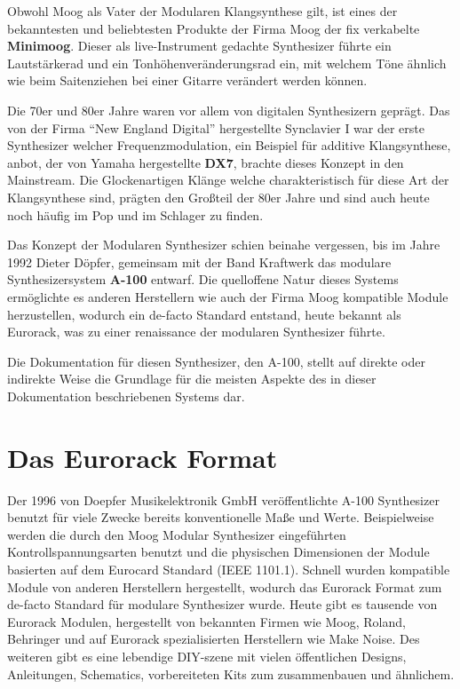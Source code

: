 Obwohl Moog als Vater der Modularen Klangsynthese gilt, ist eines der bekanntesten und beliebtesten Produkte der Firma Moog der fix verkabelte \textbf{Minimoog}. Dieser als live-Instrument gedachte Synthesizer führte ein Lautstärkerad und ein Tonhöhenveränderungsrad ein, mit welchem Töne ähnlich wie beim Saitenziehen bei einer Gitarre verändert werden können.

Die 70er und 80er Jahre waren vor allem von digitalen Synthesizern geprägt. Das von der Firma "`New England Digital"' hergestellte Synclavier I war der erste Synthesizer welcher Frequenzmodulation, ein Beispiel für additive Klangsynthese, anbot, der von Yamaha hergestellte \textbf{DX7}, brachte dieses Konzept in den Mainstream. Die Glockenartigen Klänge welche charakteristisch für diese Art der Klangsynthese sind, prägten den Großteil der 80er Jahre und sind auch heute noch häufig im Pop und im Schlager zu finden.

Das Konzept der Modularen Synthesizer schien beinahe vergessen, bis im Jahre 1992 Dieter Döpfer, gemeinsam mit der Band Kraftwerk das modulare Synthesizersystem \textbf{A-100} entwarf. Die quelloffene Natur dieses Systems ermöglichte es anderen Herstellern wie auch der Firma Moog kompatible Module herzustellen, wodurch ein de-facto Standard entstand, heute bekannt als Eurorack, was zu einer renaissance der modularen Synthesizer führte.

Die Dokumentation für diesen Synthesizer, den A-100, stellt auf direkte oder indirekte Weise die Grundlage für die meisten Aspekte des in dieser Dokumentation beschriebenen Systems dar.

\section{Das Eurorack Format}
\label{sec:orgb2947ec}

Der 1996 von Doepfer Musikelektronik GmbH veröffentlichte A-100 Synthesizer benutzt für viele Zwecke bereits konventionelle Maße und Werte. Beispielweise werden die durch den Moog Modular Synthesizer eingeführten Kontrollspannungsarten benutzt und die physischen Dimensionen der Module basierten auf dem Eurocard Standard (IEEE 1101.1). Schnell wurden kompatible Module von anderen Herstellern hergestellt, wodurch das Eurorack Format zum de-facto Standard für modulare Synthesizer wurde. Heute gibt es tausende von Eurorack Modulen, hergestellt von bekannten Firmen wie Moog, Roland, Behringer und auf Eurorack spezialisierten Herstellern wie Make Noise. Des weiteren gibt es eine lebendige DIY-szene mit vielen öffentlichen Designs, Anleitungen, Schematics, vorbereiteten Kits zum zusammenbauen und ähnlichem.

